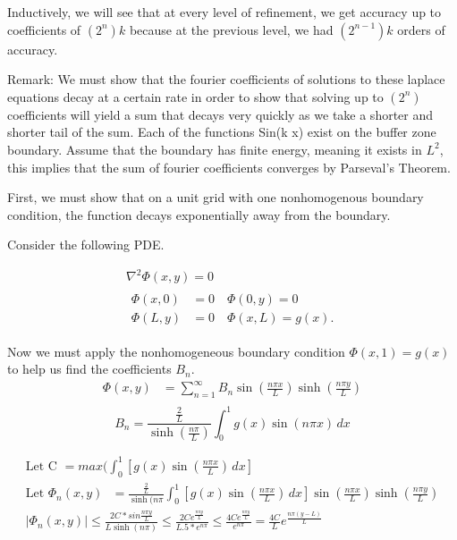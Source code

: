 \documentclass[12pt]{article}
\begin{document}
    Inductively, we will see that at every level of refinement, we get accuracy up to coefficients of $(2^n) k$ because at the previous level, we had $(2^{n-1}) k$ orders of accuracy.
    
    Remark: We must show that the fourier coefficients of solutions to these laplace equations decay at a certain rate in order to show that solving up to $(2^{n})$ coefficients will yield a sum that decays very quickly as we take a shorter and shorter tail of the sum. Each of the functions Sin(k x) exist on the buffer zone boundary. Assume that the boundary has finite energy, meaning it exists in $L^2$, this implies that the sum of fourier coefficients converges by Parseval's Theorem. 
    
    First, we must show that on a unit grid with one nonhomogenous boundary condition, the function decays exponentially away from the boundary. 
    
    Consider the following PDE. 
    
 \begin{gather}
\nabla^2 \Phi (x,y) = 0 \label{laplaceexstate}\\
\begin{split}
\Phi(x,0) &= 0 \quad \Phi(0,y) = 0 \\
\Phi(L,y) &= 0 \quad \Phi(x,L) = g(x). \label{laplaceexboundary}
\end{split}
\end{gather}    

Now we must apply the nonhomogeneous boundary condition $\Phi(x,1) = g(x)$ to help us find the coefficients $B_n$.
\begin{align*}
\Phi(x,y)  &= \sum_{n=1}^{\infty} B_n \sin(\frac{n\pi x}{L}) \sinh(\frac{n\pi y}{L}) \\
\end{align*}
\begin{equation}
B_n = \frac{\frac{2}{L}}{\sinh(\frac{n\pi}{L})} \int_0^1 g(x) \sin(n\pi x) \, dx
\end{equation}

\begin{align*}
\text{Let C }= max(\int_0^1 [g(x) \sin(\frac{n\pi x}{L}) \, dx]\\
\text{Let $\Phi_n(x, y)$ }=  \frac{\frac{2}{L}}{\sinh(n\pi}\int_0^1 [g(x) \sin(\frac{n\pi x}{L}) \, dx] \sin(\frac{n\pi x}{L}) \sinh(\frac{n\pi y}{L})\\
|\Phi_n(x, y)| \leq \frac{2C*sin \frac{n \pi y}{L}}{L\sinh(n\pi)} \leq \frac{2C e^{\frac{n \pi y}{L}}}{L.5*e^{n \pi}} \leq \frac{4C e^{\frac{n \pi y}{L}}}{e^{n \pi}} = \frac{4C}{L} e^\frac{{n \pi (y-L)}}{L}
\end{align*}
\end{document}
